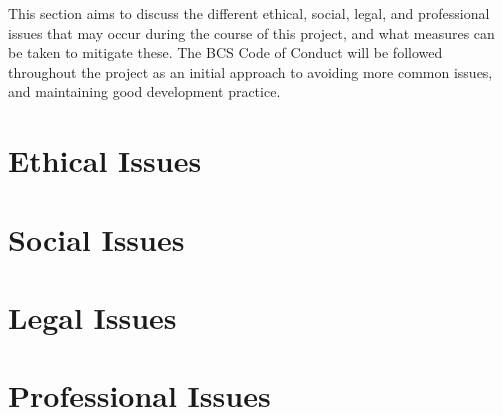 This section aims to discuss the different ethical, social, legal, and professional issues that may occur during the course of this project, and what measures can be taken to mitigate these. The BCS Code of Conduct \cite{bcs_code_of_conduct} will be followed throughout the project as an initial approach to avoiding more common issues, and maintaining good development practice.

\section{Ethical Issues}
\label{ethical_issues}


\section{Social Issues}
\label{social_issues}


\section{Legal Issues}
\label{legal_issues}


\section{Professional Issues}
\label{professional_issues}

